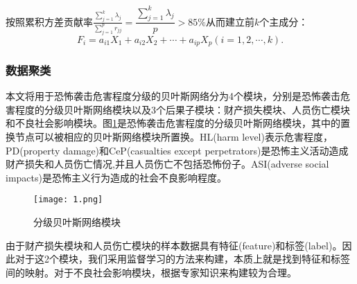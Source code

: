 \documentclass[bwprint]{gmcmthesis}
\begin{document}
按照累积方差贡献率$\frac{\sum_{j=1}^k\lambda_j}{\sum_{j=1}^pr_{jj}}= \dfrac{\sum_{j=1}^k\lambda_j}{p}>85\%$从而建立前$k$个主成分：
\begin{equation}
\mathit{F}_i=a_{i1}\mathit{X}_1+a_{i2}\mathit{X}_2+\cdots+a_{ip}\mathit{X}_p(i=1,2,\cdots,k).
\end{equation}

\subsubsection{数据聚类}
本文将用于恐怖袭击危害程度分级的贝叶斯网络分为4个模块，分别是恐怖袭击危害程度的分级贝叶斯网络模块以及3个后果子模块：财产损失模块、人员伤亡模块和不良社会影响模块。图\ref{分级贝叶斯网络模块}是恐怖袭击危害程度的分级贝叶斯网络模块，其中的置换节点可以被相应的贝叶斯网络模块所置换。HL(harm level)表示危害程度，PD(property damage)和CeP(casualties except perpetrators)是恐怖主义活动造成财产损失和人员伤亡情况,并且人员伤亡不包括恐怖份子。ASI(adverse social impacts)是恐怖主义行为造成的社会不良影响程度。
\begin{figure}[!h]
	\centering
	\texttt{[image: 1.png]}
	\caption{分级贝叶斯网络模块}
	\label{分级贝叶斯网络模块}
\end{figure}

由于财产损失模块和人员伤亡模块的样本数据具有特征(feature)和标签(label)。因此对于这2个模块，我们采用监督学习的方法来构建，本质上就是找到特征和标签间的映射。对于不良社会影响模块，根据专家知识来构建较为合理。
\end{document}
